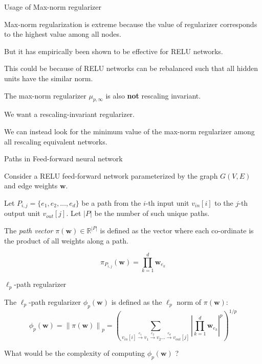 \documentclass[presentation,xcolor={usenames,dvipsnames},10pt]{beamer}
\newcommand{\norm}[1]{\left\lVert{#1}\right\rVert}
\newcommand{\vin}{v_{in}}
\newcommand{\vout}{v_{out}}
\begin{document}
\begin{frame}{Usage of Max-norm regularizer}

\bit
\item Max-norm regularization is
extreme because the value of regularizer corresponds to
the highest value among all nodes.

\item But it has empirically been shown to be effective for RELU networks. 

\item This could be because of RELU networks can be rebalanced such that all hidden units have the similar norm. 

\item The max-norm regularizer $\mu_{p,\infty}$ is also \textbf{not} rescaling invariant.

\item We want a rescaling-invariant regularizer. 

\item We can instead look for the minimum value of the max-norm regularizer among all rescaling equivalent networks. 
\eit

\end{frame}

\begin{frame}{Paths in Feed-forward neural network}

\begin{definition}
Consider a RELU feed-forward
network parameterized by the graph $G(V,E)$ and edge weights $\mathbf{w}$.

Let $P_{i,j} = \{e_1,e_2,\ldots,e_d\}$ be a path from the $i$-th input unit $v_{in}[i]$ to the $j$-th output unit $v_{out}[j]$. Let $|P|$ be the number of such unique paths. 

The {\em path vector} $\pi(\textbf{w}) \in \mathbb{R}^{|P|}$ is defined as the vector where each co-ordinate is the product of all weights along a path. 
 
$$\displaystyle \pi_{P_{i,j}}(\mathbf{w}) = \prod_{k=1}^d \mathbf{w}_{e_k}$$
\end{definition}
\end{frame}

\begin{frame}{$\ell_p$-path regularizer}
\begin{definition}
The $\ell_p$-path regularizer $\phi_p(\mathbf{w})$ is defined as the $\ell_p$ norm of
$\pi(\textbf{w})$:
\begin{equation}\label{eq:defphi}
\phi_p(\textbf{w}) = \norm{\pi(\textbf{w})}_p = 
\left(\sum_{\vin[i] \overset{e_1}\rightarrow v_1\overset{e_2}\rightarrow v_2\dots\overset{e_d}{\rightarrow}\vout[j]} \left|\prod_{k=1}^d \textbf{w}_{e_k}\right|^p\right)^{1/p}
\end{equation}

\end{definition}

\bit 
\item What would be the complexity of computing $\phi_p(\mathbf{w})$ ? 
\eit
\end{frame}
\end{document}
